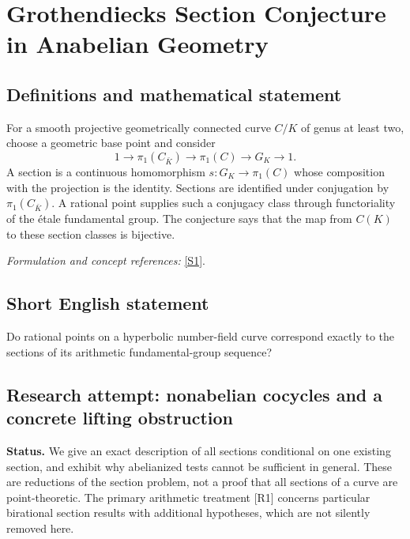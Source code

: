 \documentclass[11pt]{article}
\begin{document}
\section*{\texorpdfstring{Grothendiecks Section Conjecture in Anabelian Geometry}{Grothendiecks Section Conjecture in Anabelian Geometry}}\label{30006728}
\subsection{Definitions and mathematical statement}
For a smooth projective geometrically connected curve $C/K$ of genus at least two, choose a geometric base point and consider
\[
 1\longrightarrow\pi_1(C_{\bar K})\longrightarrow\pi_1(C)
 \longrightarrow G_K\longrightarrow1.
\]
A section is a continuous homomorphism $s:G_K\to\pi_1(C)$ whose composition with the projection is the identity. Sections are identified under conjugation by $\pi_1(C_{\bar K})$. A rational point supplies such a conjugacy class through functoriality of the étale fundamental group. The conjecture says that the map from $C(K)$ to these section classes is bijective.
\par\smallskip\textit{Formulation and concept references:} \href{https://doi.org/10.1017/CBO9780511758874.005}{[S1]}.

\subsection{Short English statement}
Do rational points on a hyperbolic number-field curve correspond exactly to the sections of its arithmetic fundamental-group sequence?
\subsection{Research attempt: nonabelian cocycles and a concrete lifting obstruction}
\textbf{Status.} We give an exact description of all sections conditional on one existing section, and exhibit why abelianized tests cannot be sufficient in general. These are reductions of the section problem, not a proof that all sections of a curve are point-theoretic. The primary arithmetic treatment [R1] concerns particular birational section results with additional hypotheses, which are not silently removed here.
\end{document}
